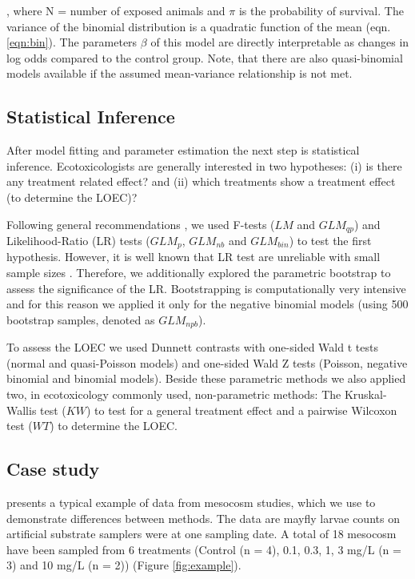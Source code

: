 \documentclass[twocolumn, natbib]{svjour3}
\begin{document}
, where N = number of exposed animals and $\pi$ is the probability of survival.
The variance of the binomial distribution is a quadratic function of the mean (eqn. \ref{eqn:bin}).
The parameters $\beta$ of this model are directly interpretable as changes in log odds compared to the control group.
Note, that there are also quasi-binomial models available if the assumed mean-variance relationship is not met. 


\subsection{Statistical Inference}
After model fitting and parameter estimation the next step is statistical inference.
Ecotoxicologists are generally interested in two hypotheses: (i) is there any treatment related effect? and (ii) which treatments show a treatment effect (to determine the LOEC)?

Following general recommendations \citep{bolker_generalized_2009,faraway_extending_2006}, we used F-tests ($LM$ and $GLM_{qp}$) and Likeli\-hood-Ratio (LR) tests ($GLM_p$, $GLM_{nb}$ and $GLM_{bin}$) to test the first hypothesis.
However, it is well known that LR test are unreliable with small sample sizes \citep{wilks_large-sample_1938}.
Therefore, we additionally explored the parametric bootstrap \citep{faraway_extending_2006} to assess the significance of the LR.
Bootstrapping is computationally very intensive and for this reason we applied it only for the negative binomial models (using 500 bootstrap samples, denoted as $GLM_{npb}$).

To assess the LOEC we used Dunnett contrasts \citep{dunnett_multiple_1955} with one-sided Wald t tests (normal and quasi-Poisson models) and one-sided Wald Z tests (Poisson, negative binomial and binomial models).
Beside these parametric methods we also applied two, in ecotoxicology commonly used, non-parametric methods: The Kruskal-Wallis test  ($KW$) to test for a general treatment effect and a pairwise Wilcoxon test ($WT$) to determine the LOEC.



\subsection{Case study}
\citet{brock_minimum_2015} presents a typical example of data from mesocosm studies, which we use to demonstrate differences between methods.
The data are mayfly larvae counts on artificial substrate samplers were at one sampling date. 
A total of 18 mesocosm have been sampled from 6 treatments (Control (n = 4), 0.1, 0.3, 1, 3 mg/L (n = 3) and 10 mg/L (n = 2)) (Figure \ref{fig:example}).
\end{document}
